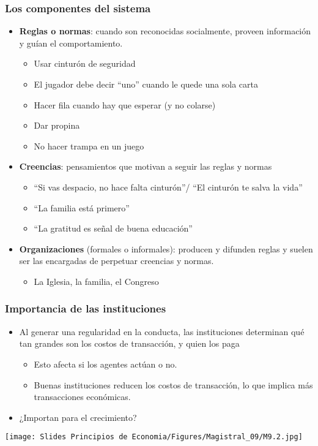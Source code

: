 \documentclass{beamer}
\begin{document}
\begin{frame}
\frametitle{Los componentes del sistema}
\begin{itemize}
    \item \textbf{Reglas o normas}: cuando son reconocidas socialmente, proveen información y guían el comportamiento.
        \begin{itemize}
        \item Usar cinturón de seguridad
        \item El jugador debe decir “uno” cuando le quede una sola carta 
        \item Hacer fila cuando hay que esperar (y no colarse) 
        \item Dar propina
        \item No hacer trampa en un juego
        \end{itemize}
    \item \textbf{Creencias}: pensamientos que motivan a seguir las reglas y normas
        \begin{itemize}
        \item “Si vas despacio, no hace falta cinturón”/ “El cinturón te salva la vida”
        \item “La familia está primero”
        \item  “La gratitud es señal de buena educación” \vspace{1mm}
        \end{itemize}
    \item \textbf{Organizaciones} (formales o informales): producen y difunden reglas y suelen ser las encargadas de perpetuar creencias y normas. 
        \begin{itemize}
        \item La Iglesia, la familia, el Congreso
        \end{itemize}
\end{itemize}
\end{frame}



\begin{frame}
\frametitle{Importancia de las instituciones}
\begin{itemize}
    \item Al generar una regularidad en la conducta, las instituciones determinan qué tan grandes son los costos de transacción, y quien los paga\vspace{1mm}
    \begin{itemize}
        \item Esto afecta si los agentes actúan o no.
        \item Buenas instituciones reducen los costos de transacción, lo que implica más transacciones económicas.\vspace{1mm}
    \end{itemize}
    \item ¿Importan para el crecimiento?
\end{itemize}
    \begin{center}
        \texttt{[image: Slides Principios de Economia/Figures/Magistral\_09/M9.2.jpg]}
    \end{center}
\end{frame}
\end{document}
